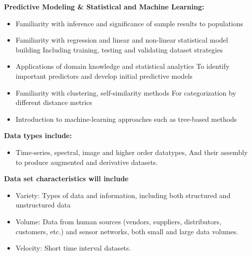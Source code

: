 \documentclass[11pt]{article} %
\begin{document}
{\bf Predictive Modeling \& Statistical and Machine Learning:}
\begin{itemize}
	\item Familiarity with inference and significance of sample results to populations 
	\item Familiarity with regression and linear and non-linear statistical model building
		\subitem Including training, testing and validating dataset strategies
	\item Applications of domain knowledge and statistical analytics 
		\subitem To identify important predictors and develop initial predictive models
	\item Familiarity with clustering, self-similarity methods 
		\subitem For categorization by different distance metrics
	\item Introduction to machine-learning approaches such as tree-based methods
\end{itemize}

{\bf Data types include:}
\begin{itemize}
	\item Time-series, spectral, image and higher order datatypes, 
	\subitem And their assembly to produce augmented and derivative datasets. 
\end{itemize}

{\bf Data set characteristics will include}
\begin{itemize}
	\item Variety: Types of data and information, including both structured and unstructured data 
	\item Volume: Data from human sources (vendors, suppliers, distributors, customers, etc.) and sensor networks,  both small and large data volumes. 
	\item Velocity: Short time interval datasets. 
\end{itemize}

%
%
\end{document}
